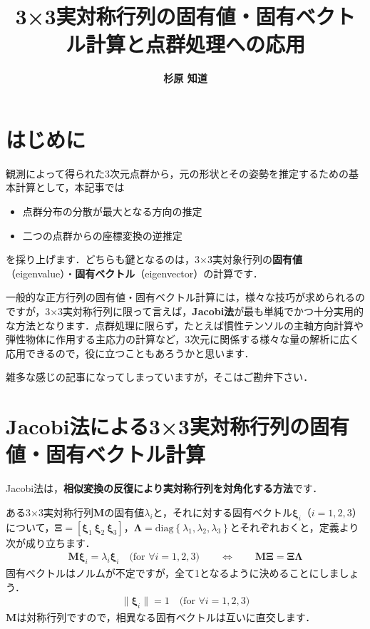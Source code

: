 ﻿\documentclass[a4paper]{jsarticle}
\title{\bf 3×3実対称行列の固有値・固有ベクトル計算と点群処理への応用}
\author{\Large{\bf 杉原 知道}}
\date{}
\begin{document}
\maketitle
\vspace{-\baselineskip}

\section{はじめに}

観測によって得られた3次元点群から，元の形状とその姿勢を推定するための基本計算として，本記事では
\begin{itemize}
\item 点群分布の分散が最大となる方向の推定
\item 二つの点群からの座標変換の逆推定
\end{itemize}
を採り上げます．どちらも鍵となるのは，3×3実対象行列の{\bf 固有値}（eigenvalue）・{\bf 固有ベクトル}（eigenvector）の計算です．

一般的な正方行列の固有値・固有ベクトル計算には，様々な技巧が求められるのですが，3×3実対称行列に限って言えば，{\bf Jacobi法}が最も単純でかつ十分実用的な方法となります．点群処理に限らず，たとえば慣性テンソルの主軸方向計算や弾性物体に作用する主応力の計算など，3次元に関係する様々な量の解析に広く応用できるので，役に立つこともあろうかと思います．

雑多な感じの記事になってしまっていますが，そこはご勘弁下さい．



\section{Jacobi法による3×3実対称行列の固有値・固有ベクトル計算}

Jacobi法は，{\bf 相似変換の反復により実対称行列を対角化する方法}です．

ある3×3実対称行列$\boldsymbol{M}$の固有値$\lambda_{i}$と，それに対する固有ベクトル$\boldsymbol{\xi}_{i}$（$i=1,2,3$）について，$\boldsymbol{\Xi}=[\boldsymbol{\xi}_{1}~\boldsymbol{\xi}_{2}~\boldsymbol{\xi}_{3}]$，$\boldsymbol{\Lambda}=\mathrm{diag}\left\{\lambda_{1},\lambda_{2},\lambda_{3}\right\}$とそれぞれおくと，定義より次が成り立ちます．
\begin{align*}
\boldsymbol{M}\boldsymbol{\xi}_{i}=\lambda_{i}\boldsymbol{\xi}_{i}
\quad\mbox{(for $\forall i=1,2,3$)}
\qquad\Leftrightarrow\qquad
\boldsymbol{M}\boldsymbol{\Xi}=\boldsymbol{\Xi}\boldsymbol{\Lambda}
\end{align*}
固有ベクトルはノルムが不定ですが，全て1となるように決めることにしましょう．
\begin{align*}
\|\boldsymbol{\xi}_{i}\|=1\quad\mbox{(for $\forall i=1,2,3$)}
\end{align*}
$\boldsymbol{M}$は対称行列ですので，相異なる固有ベクトルは互いに直交します．
\end{document}
